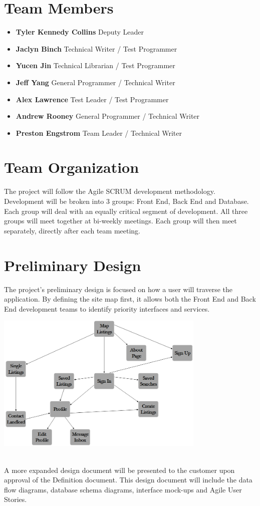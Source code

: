 \documentclass[]{article}
\begin{document}
\section{Team Members}
\begin{itemize}
	\item \textbf{Tyler Kennedy Collins} Deputy Leader
	\item \textbf{Jaclyn Binch} Technical Writer / Test Programmer
	\item \textbf{Yucen Jin} Technical Librarian / Test Programmer
	\item \textbf{Jeff Yang} General Programmer / Technical Writer
	\item \textbf{Alex Lawrence} Test Leader / Test Programmer
	\item \textbf{Andrew Rooney} General Programmer / Technical Writer
	\item \textbf{Preston Engstrom} Team Leader / Technical Writer
\end{itemize}

\section{Team Organization}
The project will follow the Agile SCRUM development methodology. Development will be broken into 3 groups: Front End, Back End and Database. Each group will deal with an equally critical segment of development. All three groups will meet together at bi-weekly meetings. Each group will then meet separately, directly after each team meeting.

\section{Preliminary Design}
The project's preliminary design is focused on how a user will traverse the application. By defining the site map first, it allows both the Front End and Back End development teams to identify priority interfaces and services.\\
\begin{center}
	\includegraphics[width=0.75\textwidth]{Phase1SiteMap.png}
\end{center}
\\
A more expanded design document will be presented to the customer upon approval of the Definition document. This design document will include the data flow diagrams, database schema diagrams, interface mock-ups and Agile User Stories.
\end{document}
